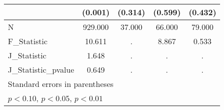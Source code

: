 {\begin{tabular}{l*{4}{c}}
            &     (0.001)         &     (0.314)         &     (0.599)         &     (0.432)         \\
\hline
N           &     929.000         &      37.000         &      66.000         &      79.000         \\
F\_Statistic &      10.611         &           .         &       8.867         &       0.533         \\
J\_Statistic &       1.648         &           .         &           .         &           .         \\
J\_Statistic\_pvalue&       0.649         &           .         &           .         &           .         \\
\hline\hline
\multicolumn{5}{l}{\footnotesize Standard errors in parentheses}\\
\multicolumn{5}{l}{\footnotesize \sym{*} \(p<0.10\), \sym{**} \(p<0.05\), \sym{***} \(p<0.01\)}\\
\end{tabular}
}
